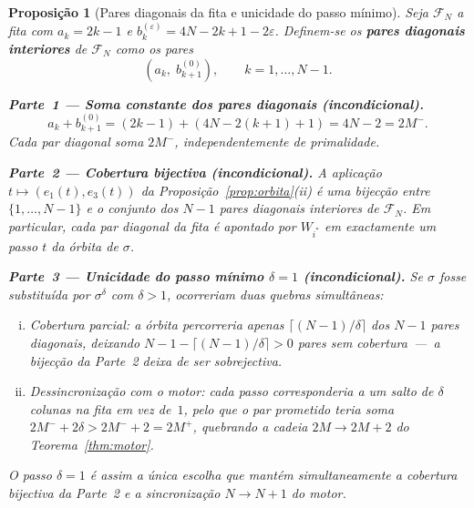 \documentclass[12pt, a4paper]{article}
\theoremstyle{plain}
\newtheorem{proposition}[theorem]{Proposição}
\theoremstyle{definition}
\theoremstyle{remark}
\begin{document}
	\begin{proposition}[Pares diagonais da fita e unicidade do passo mínimo]
		\label{prop:pares-diagonais}
		Seja $\mathcal{F}_N$ a fita com $a_k=2k-1$ e
		$b_k^{(\varepsilon)}=4N-2k+1-2\varepsilon$.  Definem-se os
		\textbf{pares diagonais interiores} de $\mathcal{F}_N$ como os
		pares
		\[
		(a_k,\;b_{k+1}^{(0)}),\qquad k=1,\ldots,N-1.
		\]
		
		\medskip
		\noindent\textbf{Parte~1 --- Soma constante dos pares diagonais
			(incondicional).}
		\[
		a_k+b_{k+1}^{(0)}
		=(2k-1)+(4N-2(k+1)+1)
		=4N-2
		=2M^-.
		\]
		Cada par diagonal soma $2M^-$, independentemente de primalidade.
		
		\medskip
		\noindent\textbf{Parte~2 --- Cobertura bijectiva (incondicional).}
		A aplicação $t\mapsto(e_1(t),e_3(t))$ da
		Proposição~\ref{prop:orbita}(ii) é uma bijecção entre
		$\{1,\ldots,N-1\}$ e o conjunto dos $N-1$ pares diagonais
		interiores de $\mathcal{F}_N$.  Em particular, cada par diagonal
		da fita é \emph{apontado} por $W_{i^*}$ em exactamente um passo
		$t$ da órbita de $\sigma$.
		
		\medskip
		\noindent\textbf{Parte~3 --- Unicidade do passo mínimo $\delta=1$
			(incondicional).}
		Se $\sigma$ fosse substituída por $\sigma^\delta$ com $\delta>1$,
		ocorreriam duas quebras simultâneas:
		\begin{enumerate}[(i)]
			\item \emph{Cobertura parcial}: a órbita percorreria apenas
			$\lceil(N-1)/\delta\rceil$ dos $N-1$ pares diagonais,
			deixando $N-1-\lceil(N-1)/\delta\rceil>0$ pares sem
			cobertura~---~a bijecção da Parte~2 deixa de ser sobrejectiva.
			\item \emph{Dessincronização com o motor}: cada passo
			corresponderia a um salto de $\delta$ colunas na fita em vez
			de~$1$, pelo que o par prometido teria soma
			$2M^-+2\delta>2M^-+2=2M^+$, quebrando a cadeia
			$2M\to2M{+}2$ do Teorema~\ref{thm:motor}.
		\end{enumerate}
		O passo $\delta=1$ é assim a \emph{única} escolha que mantém
		simultaneamente a cobertura bijectiva da Parte~2 e a
		sincronização $N\to N{+}1$ do motor.
	\end{proposition}
	
\end{document}
